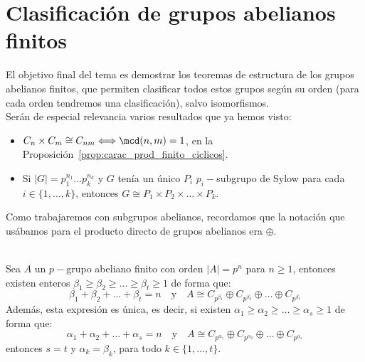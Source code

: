 \chapter{Clasificación de grupos abelianos finitos}
\noindent
El objetivo final del tema es demostrar los teoremas de estructura de los grupos abelianos finitos, que permiten clasificar todos estos grupos según su orden (para cada orden tendremos una clasificación), salvo isomorfismos.\\

Serán de especial relevancia varios resultados que ya hemos visto: %
\begin{itemize}
    \item $C_n\times C_m \cong C_{nm} \Longleftrightarrow \mcd(n,m) = 1$, en la Proposición~\ref{prop:carac_prod_finito_ciclicos}.
    \item Si $|G| = p_1^{n_1} \ldots p_k^{n_k}$ y $G$ tenía un único $P_i$ $p_i-$subgrupo de Sylow para cada $i \in \{1,\ldots,k\}$, entonces $G\cong P_1\times P_2\times \ldots \times P_k$.
\end{itemize}
Como trabajaremos con subgrupos abelianos, recordamos que la notación que usábamos para el producto directo de grupos abelianos era $\oplus$.

\begin{teo}\label{teo:1_tema6}\ \\
    Sea $A$ un $p-$grupo abeliano finito con orden $|A| = p^n$ para $n\geq 1$, entonces existen enteros $\beta_1\geq \beta_2 \geq \ldots \geq \beta_t \geq 1$ de forma que:
    \begin{equation*}
        \beta_1 + \beta_2 + \ldots + \beta_t = n \quad \text{y} \quad A\cong C_{p^{\beta_1}} \oplus C_{p^{\beta_2}} \oplus \ldots \oplus C_{p^{\beta_t}}
    \end{equation*}
    Además, esta expresión es única, es decir, si existen $\alpha_1\geq \alpha_2\geq \ldots \geq \alpha_s \geq 1$ de forma que:
    \begin{equation*}
        \alpha_1 + \alpha_2 + \ldots + \alpha_s = n \quad \text{y} \quad A\cong C_{p^{\alpha_1}} \oplus C_{p^{\alpha_2}} \oplus \ldots \oplus C_{p^{\alpha_s}}
    \end{equation*}
    entonces $s = t$ y $\alpha_k = \beta_k$, para todo $k \in \{1,\ldots,t\}$.
\end{teo}

